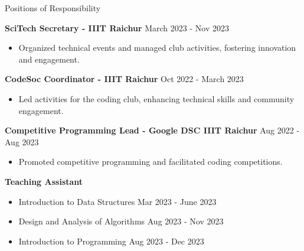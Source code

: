 \documentclass{resume} %
\begin{document}

\begin{rSection}{Positions of Responsibility}

\textbf{SciTech Secretary - IIIT Raichur} \hfill March 2023 - Nov 2023
 \begin{itemize}
    \itemsep -3pt {} 
     \item Organized technical events and managed club activities, fostering innovation and engagement.
 \end{itemize}

\textbf{CodeSoc Coordinator - IIIT Raichur} \hfill Oct 2022 - March 2023
 \begin{itemize}
    \itemsep -3pt {} 
     \item Led activities for the coding club, enhancing technical skills and community engagement.
 \end{itemize}

\textbf{Competitive Programming Lead - Google DSC IIIT Raichur} \hfill Aug 2022 - Aug 2023
 \begin{itemize}
    \itemsep -3pt {} 
     \item Promoted competitive programming and facilitated coding competitions.
 \end{itemize}

\textbf{Teaching Assistant}
 \begin{itemize}
    \itemsep -3pt {}
     \item Introduction to Data Structures \hfill Mar 2023 - June 2023
     \item Design and Analysis of Algorithms \hfill Aug 2023 - Nov 2023
     \item Introduction to Programming \hfill Aug 2023 - Dec 2023
 \end{itemize}

\end{rSection}
\end{document}
